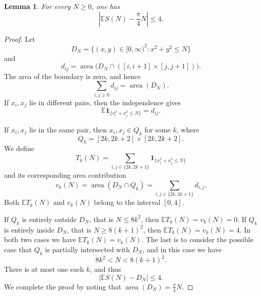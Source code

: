 \documentclass[10pt,a4paper]{amsart}
\newtheorem{lemma}{Lemma}
\DeclareMathOperator{\area}{area}
\newcommand{\E}{\mathbb E}
\newcommand{\ind}{\mathbf 1}
\begin{document}
\begin{lemma}\label{lem:mean}
For every $N\ge0$, one has
\begin{equation}\label{eq:mean}
 \left|\E S(N)-\frac{\pi}{4}N\right|\le4.
\end{equation}
\end{lemma}

\begin{proof}
Let
\[
 D_N=\{(x,y)\in[0,\infty)^2:x^2+y^2\le N\}
\]
and
\[
 d_{ij}=\area\bigl(D_N\cap([i,i+1]\times[j,j+1])\bigr).
\]
The area of the boundary is
zero, and hence
\begin{equation*}
 \sum_{i,j\ge0}d_{ij}=\area(D_N).
\end{equation*}
If $x_i,x_j$ lie in different pairs, then the independence gives
\begin{equation*}
 \E\ind_{\{x_i^2+x_j^2\le N\}}=d_{ij}.
\end{equation*}

If $x_i,x_j$ lie in the same pair, then $x_i,x_j\in Q_k$ for some $k$, where
\[
 Q_k=[2k,2k+2]\times[2k,2k+2].
\]
We define
\begin{equation}\label{eq:defineTk}
 T_k(N)=\sum_{i,j\in\{2k,2k+1\}}
       \ind_{\{x_i^2+x_j^2\le N\}}
       \end{equation}
       and its corresponding area contribution
\[
 v_k(N)=\area(D_N\cap Q_k)=\sum_{i,j\in\{2k,2k+1\}}d_{i,j}.
\]
Both $\E T_k(N)$ and $v_k(N)$ belong to the interval $[0,4]$.

If $Q_k$ is entirely outside $D_N$, that is $N\le8k^2$, then $\E T_k(N)=v_k(N)=0$. If $Q_k$ is entirely inside $D_N$, that is $N\ge8(k+1)^2$, then $\E T_k(N)=v_k(N)=4$.
In both two cases we have $\E T_k(N)=v_k(N)$. The last is to consider the possible case that $Q_k$ is partially intersected with $D_N$, and in this case we have
\begin{equation*}
 8k^2<N<8(k+1)^2.
\end{equation*}
There is at most one such $k$, and thus
\begin{equation*}
 \left|\E S(N)-D_N\right|\le 4.
\end{equation*}
We complete the proof by noting that $\area(D_N)=\frac{\pi}{4}N$.
\end{proof}
\end{document}
